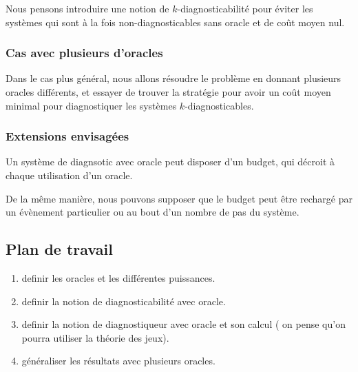 \documentclass[a4paper,10pt]{article}
\begin{document}
Nous pensons introduire une notion de $k$-diagnosticabilit\'e pour \'eviter les syst\`emes qui sont \`a la fois non-diagnosticables sans oracle et de co\^ut moyen nul.

\subsubsection{Cas avec plusieurs d'oracles}

Dans le cas plus g\'en\'eral, nous allons r\'esoudre le probl\`eme en donnant plusieurs oracles diff\'erents, et essayer de trouver la strat\'egie pour avoir un co\^ut moyen minimal pour diagnostiquer les syst\`emes $k$-diagnosticables.

\subsubsection{Extensions envisag\'ees}

Un système de diagnsotic avec oracle peut disposer d'un budget, qui décroit \`a chaque utilisation d'un oracle.

De la m\^eme mani\`ere, nous pouvons supposer que le budget peut \^etre recharg\'e par un \'ev\`enement particulier ou au bout d'un nombre de pas du syst\`eme.

\subsection{Plan de travail}

\begin{enumerate}
\item definir les oracles et les diff\'erentes puissances.
\item definir la notion de diagnosticabilité avec oracle.
\item definir la notion de diagnostiqueur avec oracle et son calcul ( on pense qu'on pourra utiliser la théorie des jeux).
\item g\'en\'eraliser les r\'esultats avec plusieurs oracles.
\end{enumerate}
\end{document}
